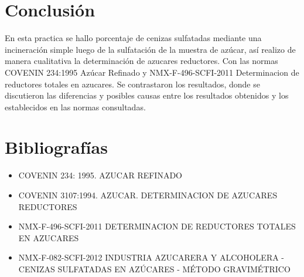 \documentclass[a4paper,12pt]{article} %
\begin{document}
\section{Conclusión}
En esta practica se hallo porcentaje de cenizas sulfatadas mediante una incineración simple luego de la sulfatación de la muestra de azúcar, así realizo de manera cualitativa la determinación de azucares reductores. Con las normas COVENIN 234:1995 Azúcar Refinado y NMX-F-496-SCFI-2011 Determinacion de reductores totales en azucares. Se contrastaron los resultados, donde se discutieron las diferencias y posibles causas entre los resultados obtenidos y los establecidos en las normas consultadas.

\newpage

\section {Bibliografías}
\begin{itemize}
    \item {COVENIN 234: 1995. AZUCAR REFINADO}
    \item {COVENIN 3107:1994. AZUCAR. DETERMINACION DE AZUCARES REDUCTORES}
    \item {NMX-F-496-SCFI-2011 DETERMINACION DE REDUCTORES TOTALES EN AZUCARES}
    \item{NMX-F-082-SCFI-2012 INDUSTRIA AZUCARERA Y ALCOHOLERA - CENIZAS SULFATADAS EN AZÚCARES - MÉTODO GRAVIMÉTRICO }
\end{itemize}


\printbibliography[
heading=bibintoc,
title={Bibliografías}
]
\end{document}
